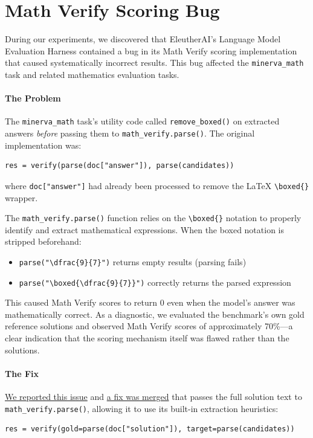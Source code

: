 \clearpage

\section{Math Verify Scoring Bug}
\label{app:sec:math_verify_bug}

During our experiments, we discovered that EleutherAI's Language Model Evaluation Harness \citep{gao2024evalharness} contained a bug in its Math Verify scoring implementation that caused systematically incorrect results.
This bug affected the \texttt{minerva\_math} task and related mathematics evaluation tasks.

\paragraph{The Problem}
The \texttt{minerva\_math} task's utility code called \texttt{remove\_boxed()} on extracted answers \emph{before} passing them to \texttt{math\_verify.parse()}.
The original implementation was:
\begin{verbatim}
res = verify(parse(doc["answer"]), parse(candidates))
\end{verbatim}
where \texttt{doc["answer"]} had already been processed to remove the \LaTeX{} \verb|\boxed{}| wrapper.

The \texttt{math\_verify.parse()} function relies on the \verb|\boxed{}| notation to properly identify and extract mathematical expressions.
When the boxed notation is stripped beforehand:
\begin{itemize}
    \item \texttt{parse("\textbackslash dfrac\{9\}\{7\}")} returns empty results (parsing fails)
    \item \texttt{parse("\textbackslash boxed\{\textbackslash dfrac\{9\}\{7\}\}")} correctly returns the parsed expression
\end{itemize}

This caused Math Verify scores to return 0 even when the model's answer was mathematically correct.
As a diagnostic, we evaluated the benchmark's own gold reference solutions and observed Math Verify scores of approximately 70\%---a clear indication that the scoring mechanism itself was flawed rather than the solutions.

\paragraph{The Fix}
\href{https://github.com/EleutherAI/lm-evaluation-harness/issues/3210}{We reported this issue} and \href{https://github.com/EleutherAI/lm-evaluation-harness/pull/3259}{a fix was merged} that passes the full solution text to \texttt{math\_verify.parse()}, allowing it to use its built-in extraction heuristics:
\begin{verbatim}
res = verify(gold=parse(doc["solution"]), target=parse(candidates))
\end{verbatim}

